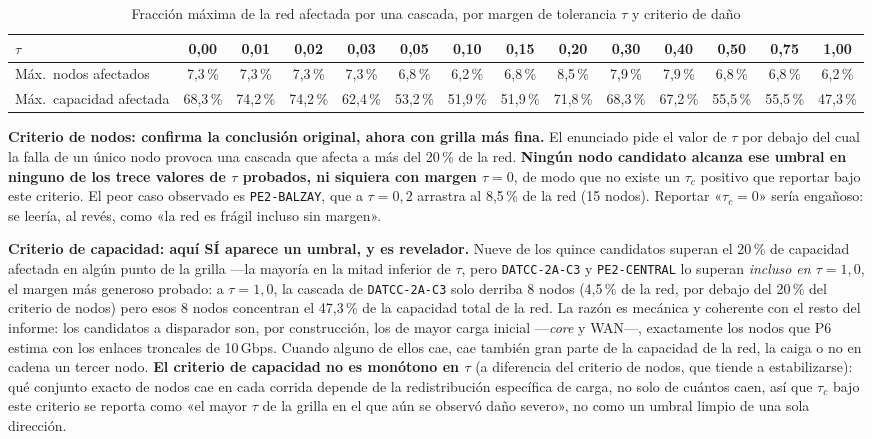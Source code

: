 \documentclass[10pt,a4paper]{extarticle}
\newcommand{\code}[1]{\texttt{\small #1}}
\begin{document}
\begin{table}[H]
\centering
\caption{Fracción máxima de la red afectada por una cascada, por margen de tolerancia $\tau$ y criterio de daño}
\label{tab:cascada}
\small
\begin{adjustbox}{max width=\textwidth}
\begin{tabular}{lccccccccccccc}
\toprule
$\tau$ & 0,00 & 0,01 & 0,02 & 0,03 & 0,05 & 0,10 & 0,15 & 0,20 & 0,30 & 0,40 & 0,50 & 0,75 & 1,00 \\
\midrule
Máx.\ nodos afectados      & 7,3\,\%  & 7,3\,\%  & 7,3\,\%  & 7,3\,\%  & 6,8\,\%  & 6,2\,\%  & 6,8\,\%  & 8,5\,\%  & 7,9\,\%  & 7,9\,\%  & 6,8\,\%  & 6,8\,\%  & 6,2\,\%  \\
Máx.\ capacidad afectada   & 68,3\,\% & 74,2\,\% & 74,2\,\% & 62,4\,\% & 53,2\,\% & 51,9\,\% & 51,9\,\% & 71,8\,\% & 68,3\,\% & 67,2\,\% & 55,5\,\% & 55,5\,\% & 47,3\,\% \\
\bottomrule
\end{tabular}
\end{adjustbox}
\end{table}

\textbf{Criterio de nodos: confirma la conclusión original, ahora con grilla más fina.} El
enunciado pide el valor de $\tau$ por debajo del cual la falla de un único nodo provoca una
cascada que afecta a más del 20\,\% de la red. \textbf{Ningún nodo candidato alcanza ese
umbral en ninguno de los trece valores de $\tau$ probados, ni siquiera con margen $\tau =
0$}, de modo que no existe un $\tau_c$ positivo que reportar bajo este criterio. El peor caso
observado es \code{PE2-BALZAY}, que a $\tau = 0{,}2$ arrastra al 8,5\,\% de la red (15
nodos). Reportar «$\tau_c = 0$» sería engañoso: se leería, al revés, como «la red es frágil
incluso sin margen».

\textbf{Criterio de capacidad: aquí SÍ aparece un umbral, y es revelador.} Nueve de los quince
candidatos superan el 20\,\% de capacidad afectada en algún punto de la grilla ---la mayoría
en la mitad inferior de $\tau$, pero \code{DATCC-2A-C3} y \code{PE2-CENTRAL} lo superan
\textit{incluso en $\tau = 1{,}0$}, el margen más generoso probado: a $\tau=1{,}0$, la
cascada de \code{DATCC-2A-C3} solo derriba 8 nodos (4,5\,\% de la red, por debajo del 20\,\%
del criterio de nodos) pero esos 8 nodos concentran el 47,3\,\% de la capacidad total de la
red. La razón es mecánica y coherente con el resto del informe: los candidatos a disparador
son, por construcción, los de mayor carga inicial ---\textit{core} y WAN---, exactamente los
nodos que P6 estima con los enlaces troncales de 10\,Gbps. Cuando alguno de ellos cae, cae
también gran parte de la capacidad de la red, la caiga o no en cadena un tercer nodo.
\textbf{El criterio de capacidad no es monótono en $\tau$} (a diferencia del criterio de
nodos, que tiende a estabilizarse): qué conjunto exacto de nodos cae en cada corrida depende
de la redistribución específica de carga, no solo de cuántos caen, así que $\tau_c$ bajo este
criterio se reporta como «el mayor $\tau$ de la grilla en el que aún se observó daño
severo», no como un umbral limpio de una sola dirección.
\end{document}
